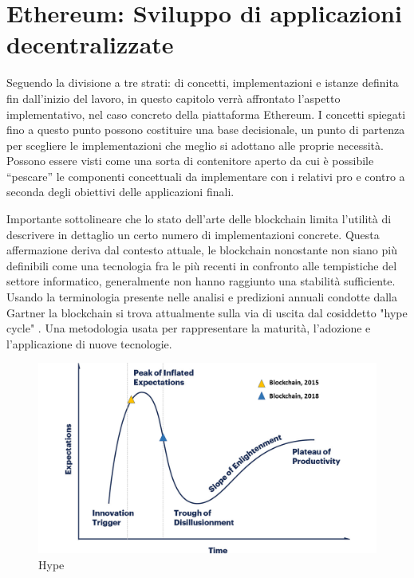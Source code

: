 \chapter{Ethereum: Sviluppo di applicazioni decentralizzate}
\label{ch:ethereum}

Seguendo la divisione a tre strati: di concetti, implementazioni e istanze definita fin dall'inizio del lavoro, in questo capitolo verrà affrontato l'aspetto implementativo, nel caso concreto della piattaforma Ethereum. I concetti spiegati fino a questo punto possono costituire una base decisionale, un punto di partenza per scegliere le implementazioni che meglio si adottano alle proprie necessità. Possono essere visti come una sorta di contenitore aperto da cui è possibile “pescare” le componenti concettuali da implementare con i relativi pro e contro a seconda degli obiettivi delle applicazioni finali. 

Importante sottolineare che lo stato dell'arte delle blockchain limita l’utilità di descrivere in dettaglio un certo numero di implementazioni concrete. Questa affermazione deriva dal contesto attuale, le blockchain nonostante non siano più definibili come una tecnologia fra le più recenti in confronto alle tempistiche del settore informatico, generalmente non hanno raggiunto una stabilità sufficiente. Usando la terminologia presente nelle analisi e predizioni annuali condotte dalla Gartner la blockchain si trova attualmente sulla via di uscita dal cosiddetto "hype cycle" \smallskip {}. Una metodologia usata per rappresentare la maturità, l'adozione e l'applicazione di nuove tecnologie.

\begin{figure}[H]
\centering
\includegraphics[width=1\textwidth]{immagini/blockchainHype.png}
\caption{Hype}
\label{fig:mesh7}
\end{figure}

